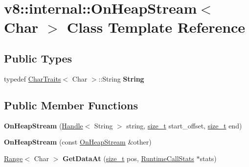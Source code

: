 \hypertarget{classv8_1_1internal_1_1OnHeapStream}{}\section{v8\+:\+:internal\+:\+:On\+Heap\+Stream$<$ Char $>$ Class Template Reference}
\label{classv8_1_1internal_1_1OnHeapStream}
\subsection*{Public Types}
\begin{DoxyCompactItemize}
\item 
\mbox{\label{classv8_1_1internal_1_1OnHeapStream_a72a785f342eb9f07ab486b653c4ebaf7}} 
typedef \mbox{\hyperlink{structv8_1_1internal_1_1CharTraits}{Char\+Traits}}$<$ Char $>$\+::String {\bfseries String}
\end{DoxyCompactItemize}
\subsection*{Public Member Functions}
\begin{DoxyCompactItemize}
\item 
\mbox{\label{classv8_1_1internal_1_1OnHeapStream_ac7be82d95bcc13081844ce0800ff78f2}} 
{\bfseries On\+Heap\+Stream} (\mbox{\hyperlink{classv8_1_1internal_1_1Handle}{Handle}}$<$ String $>$ string, \mbox{\hyperlink{classsize__t}{size\+\_\+t}} start\+\_\+offset, \mbox{\hyperlink{classsize__t}{size\+\_\+t}} end)
\item 
\mbox{\label{classv8_1_1internal_1_1OnHeapStream_a9ec094b4447539e4453848b7d076fcd1}} 
{\bfseries On\+Heap\+Stream} (const \mbox{\hyperlink{classv8_1_1internal_1_1OnHeapStream}{On\+Heap\+Stream}} \&other)
\item 
\mbox{\label{classv8_1_1internal_1_1OnHeapStream_aef90877d264d9c051ec26ac8c3c47290}} 
\mbox{\hyperlink{structv8_1_1internal_1_1Range}{Range}}$<$ Char $>$ {\bfseries Get\+Data\+At} (\mbox{\hyperlink{classsize__t}{size\+\_\+t}} pos, \mbox{\hyperlink{classv8_1_1internal_1_1RuntimeCallStats}{Runtime\+Call\+Stats}} $\ast$stats)
\end{DoxyCompactItemize}
